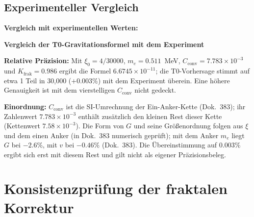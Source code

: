 	\subsection{Experimenteller Vergleich}
	
	\begin{verification}
		\textbf{Vergleich mit experimentellen Werten:}
		
		\begin{center}
		\end{center}
		
		\textbf{Vergleich der T0-Gravitationsformel mit dem Experiment}
		
		\textbf{Relative Präzision:} Mit $\xi_0 = 4/30000$, $m_e = 0.511$~MeV, $C_{\text{conv}} = 7.783\times10^{-3}$ und $K_{\text{frak}} = 0.986$ ergibt die Formel $6.6745\times10^{-11}$; die T0-Vorhersage stimmt auf etwa 1 Teil in 30,000 ($+0.003\%$) mit dem Experiment überein. Eine höhere Genauigkeit ist mit dem vierstelligen $C_{\text{conv}}$ nicht gedeckt.

		\textbf{Einordnung:} $C_{\text{conv}}$ ist die SI-Umrechnung der Ein-Anker-Kette (Dok.~383); ihr Zahlenwert $7.783\times10^{-3}$ enthält zusätzlich den kleinen Rest dieser Kette (Kettenwert $7.58\times10^{-3}$). Die Form von $G$ und seine Größenordnung folgen aus $\xi$ und dem einen Anker (in Dok.~383 numerisch geprüft); mit dem Anker $m_e$ liegt $G$ bei $-2.6\%$, mit $v$ bei $-0.46\%$ (Dok.~383). Die Übereinstimmung auf $0.003\%$ ergibt sich erst mit diesem Rest und gilt nicht als eigener Präzisionsbeleg.
	\end{verification}
	
	\section{Konsistenzprüfung der fraktalen Korrektur}
	
